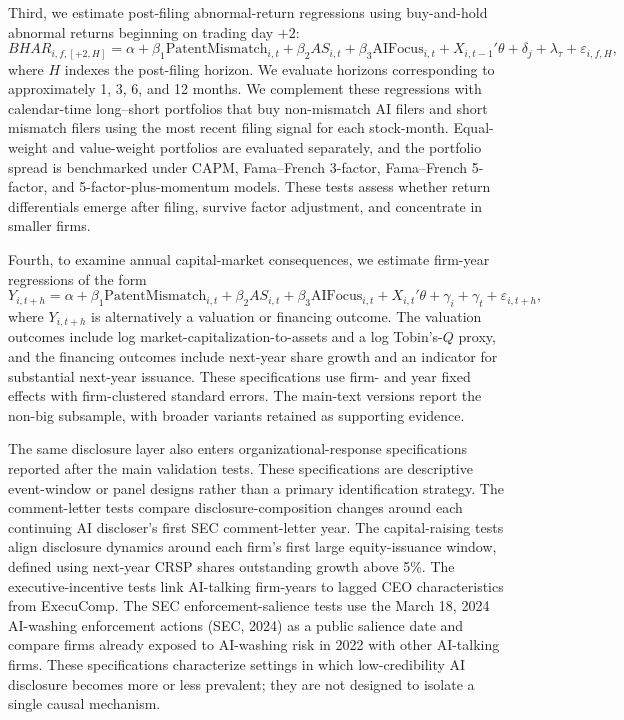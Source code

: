 Third, we estimate post-filing abnormal-return regressions using buy-and-hold abnormal returns beginning on trading day $+2$:
\[
BHAR_{i,f,[+2,H]}
=
\alpha + \beta_1 \mathrm{PatentMismatch}_{i,t}
+ \beta_2 AS_{i,t}
+ \beta_3 \mathrm{AIFocus}_{i,t}
+ X_{i,t-1}'\theta + \delta_{j} + \lambda_{\tau} + \varepsilon_{i,f,H},
\]
where $H$ indexes the post-filing horizon. We evaluate horizons corresponding to approximately 1, 3, 6, and 12 months. We complement these regressions with calendar-time long--short portfolios that buy non-mismatch AI filers and short mismatch filers using the most recent filing signal for each stock-month. Equal-weight and value-weight portfolios are evaluated separately, and the portfolio spread is benchmarked under CAPM, Fama--French 3-factor, Fama--French 5-factor, and 5-factor-plus-momentum models. These tests assess whether return differentials emerge after filing, survive factor adjustment, and concentrate in smaller firms.

Fourth, to examine annual capital-market consequences, we estimate firm-year regressions of the form
\[
Y_{i,t+h}
=
\alpha + \beta_1 \mathrm{PatentMismatch}_{i,t}
+ \beta_2 AS_{i,t}
+ \beta_3 \mathrm{AIFocus}_{i,t}
+ X_{i,t}'\theta + \gamma_i + \gamma_t + \varepsilon_{i,t+h},
\]
where $Y_{i,t+h}$ is alternatively a valuation or financing outcome. The valuation outcomes include log market-capitalization-to-assets and a log Tobin's-$Q$ proxy, and the financing outcomes include next-year share growth and an indicator for substantial next-year issuance. These specifications use firm- and year fixed effects with firm-clustered standard errors. The main-text versions report the non-big subsample, with broader variants retained as supporting evidence.

The same disclosure layer also enters organizational-response specifications reported after the main validation tests. These specifications are descriptive event-window or panel designs rather than a primary identification strategy. The comment-letter tests compare disclosure-composition changes around each continuing AI discloser's first SEC comment-letter year. The capital-raising tests align disclosure dynamics around each firm's first large equity-issuance window, defined using next-year CRSP shares outstanding growth above 5\%. The executive-incentive tests link AI-talking firm-years to lagged CEO characteristics from ExecuComp. The SEC enforcement-salience tests use the March 18, 2024 AI-washing enforcement actions (SEC, 2024) as a public salience date and compare firms already exposed to AI-washing risk in 2022 with other AI-talking firms. These specifications characterize settings in which low-credibility AI disclosure becomes more or less prevalent; they are not designed to isolate a single causal mechanism.

